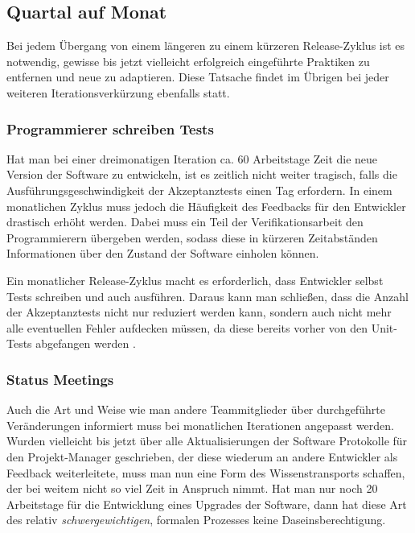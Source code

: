 \subsection{Quartal auf Monat}
\label{subsec:quartal-auf-monat}

Bei jedem Übergang von einem längeren zu einem kürzeren Release-Zyklus ist es
notwendig, gewisse bis jetzt vielleicht erfolgreich eingeführte Praktiken zu
entfernen und neue zu adaptieren. Diese Tatsache findet im Übrigen bei jeder 
weiteren Iterationsverkürzung ebenfalls statt.

\subsubsection{Programmierer schreiben Tests}
\label{minisec:programmierer-schreiben-tests}
Hat man bei einer dreimonatigen Iteration ca. 60 Arbeitstage Zeit die neue
Version der Software zu entwickeln, ist es zeitlich nicht weiter tragisch,
falls die Ausführungsgeschwindigkeit der Akzeptanztests einen Tag erfordern.
In einem monatlichen Zyklus muss jedoch die Häufigkeit des Feedbacks für den
Entwickler drastisch erhöht werden. Dabei muss ein Teil der
Verifikationsarbeit den Programmierern übergeben werden, sodass diese in
kürzeren Zeitabständen Informationen über den Zustand der Software einholen
können.

Ein monatlicher Release-Zyklus macht es erforderlich, dass Entwickler selbst
Tests schreiben und auch ausführen. Daraus kann man schließen, dass die Anzahl
der Akzeptanztests nicht nur reduziert werden kann, sondern auch nicht mehr
alle eventuellen Fehler aufdecken müssen, da diese bereits vorher von den
Unit-Tests abgefangen werden \cite{pragunittesting2003}.

\subsubsection{Status Meetings}
\label{minisec:status-meetings}

Auch die Art und Weise wie man andere Teammitglieder über durchgeführte
Veränderungen informiert muss bei monatlichen Iterationen angepasst werden.
Wurden vielleicht bis jetzt über alle Aktualisierungen der Software Protokolle
für den Projekt-Manager geschrieben, der diese wiederum an andere Entwickler
als Feedback weiterleitete, muss man nun eine Form des Wissenstransports
schaffen, der bei weitem nicht so viel Zeit in Anspruch nimmt. Hat man nur
noch 20 Arbeitstage für die Entwicklung eines Upgrades der Software, dann hat
diese Art des relativ \emph{schwergewichtigen}, formalen Prozesses keine
Daseinsberechtigung.

